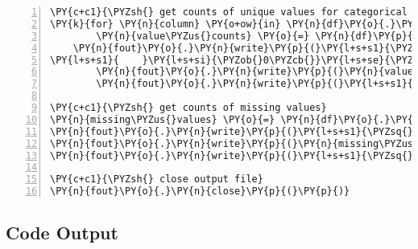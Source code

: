 \documentclass[12pt]{article}
\begin{document}
\begin{Verbatim}[commandchars=\\\{\},numbers=left,firstnumber=1,stepnumber=1,formatcom=\footnotesize]
\PY{c+c1}{\PYZsh{} get counts of unique values for categorical variables}
\PY{k}{for} \PY{n}{column} \PY{o+ow}{in} \PY{n}{df}\PY{o}{.}\PY{n}{select\PYZus{}dtypes}\PY{p}{(}\PY{n}{include}\PY{o}{=}\PY{p}{[}\PY{l+s+s1}{\PYZsq{}}\PY{l+s+s1}{object}\PY{l+s+s1}{\PYZsq{}}\PY{p}{]}\PY{p}{)}\PY{p}{:}
        \PY{n}{value\PYZus{}counts} \PY{o}{=} \PY{n}{df}\PY{p}{[}\PY{n}{column}\PY{p}{]}\PY{o}{.}\PY{n}{value\PYZus{}counts}\PY{p}{(}\PY{p}{)}
    \PY{n}{fout}\PY{o}{.}\PY{n}{write}\PY{p}{(}\PY{l+s+s1}{\PYZsq{}}\PY{l+s+s1}{Counts of Unique Values for Categorical Variable: }\PY{l+s+se}{\PYZbs{}}
\PY{l+s+s1}{    }\PY{l+s+si}{\PYZob{}0\PYZcb{}}\PY{l+s+se}{\PYZbs{}n}\PY{l+s+s1}{\PYZsq{}}\PY{o}{.}\PY{n}{format}\PY{p}{(}\PY{n}{column}\PY{p}{)}\PY{p}{)}
        \PY{n}{fout}\PY{o}{.}\PY{n}{write}\PY{p}{(}\PY{n}{value\PYZus{}counts}\PY{o}{.}\PY{n}{to\PYZus{}string}\PY{p}{(}\PY{p}{)}\PY{p}{)}
        \PY{n}{fout}\PY{o}{.}\PY{n}{write}\PY{p}{(}\PY{l+s+s1}{\PYZsq{}}\PY{l+s+se}{\PYZbs{}n}\PY{l+s+se}{\PYZbs{}n}\PY{l+s+s1}{\PYZsq{}}\PY{p}{)}

\PY{c+c1}{\PYZsh{} get counts of missing values}
\PY{n}{missing\PYZus{}values} \PY{o}{=} \PY{n}{df}\PY{o}{.}\PY{n}{isnull}\PY{p}{(}\PY{p}{)}\PY{o}{.}\PY{n}{sum}\PY{p}{(}\PY{p}{)}
\PY{n}{fout}\PY{o}{.}\PY{n}{write}\PY{p}{(}\PY{l+s+s1}{\PYZsq{}}\PY{l+s+s1}{Counts of Missing Values:}\PY{l+s+se}{\PYZbs{}n}\PY{l+s+s1}{\PYZsq{}}\PY{p}{)}
\PY{n}{fout}\PY{o}{.}\PY{n}{write}\PY{p}{(}\PY{n}{missing\PYZus{}values}\PY{o}{.}\PY{n}{to\PYZus{}string}\PY{p}{(}\PY{p}{)}\PY{p}{)}
\PY{n}{fout}\PY{o}{.}\PY{n}{write}\PY{p}{(}\PY{l+s+s1}{\PYZsq{}}\PY{l+s+se}{\PYZbs{}n}\PY{l+s+se}{\PYZbs{}n}\PY{l+s+s1}{\PYZsq{}}\PY{p}{)}

\PY{c+c1}{\PYZsh{} close output file}
\PY{n}{fout}\PY{o}{.}\PY{n}{close}\PY{p}{(}\PY{p}{)}
\end{Verbatim}


\subsection{Code Output}
\end{document}
